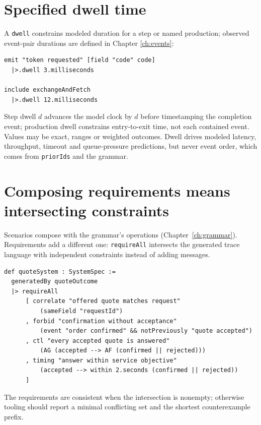 \section{Specified dwell time}

A \texttt{dwell} constrains modeled duration for a step or named production;
observed event-pair durations are defined in Chapter \ref{ch:events}:

\begin{lstlisting}
emit "token requested" [field "code" code]
  |>.dwell 3.milliseconds

include exchangeAndFetch
  |>.dwell 12.milliseconds
\end{lstlisting}

Step dwell $d$ advances the model clock by $d$ before timestamping the completion
event; production dwell constrains entry-to-exit time, not each contained event.
Values may be exact, ranges or weighted outcomes. Dwell drives modeled latency,
throughput, timeout and queue-pressure predictions, but never event order, which
comes from \texttt{priorIds} and the grammar.

\section{Composing requirements means intersecting constraints}

Scenarios compose with the grammar's operations (Chapter~\ref{ch:grammar}).
Requirements add a different one: \texttt{requireAll} intersects the generated
trace language with independent constraints instead of adding messages.

\begin{lstlisting}
def quoteSystem : SystemSpec :=
  generatedBy quoteOutcome
  |> requireAll
      [ correlate "offered quote matches request"
          (sameField "requestId")
      , forbid "confirmation without acceptance"
          (event "order confirmed" && notPreviously "quote accepted")
      , ctl "every accepted quote is answered"
          (AG (accepted --> AF (confirmed || rejected)))
      , timing "answer within service objective"
          (accepted --> within 2.seconds (confirmed || rejected))
      ]
\end{lstlisting}

The requirements are consistent when the intersection is nonempty; otherwise
tooling should report a minimal conflicting set and the shortest counterexample
prefix.
